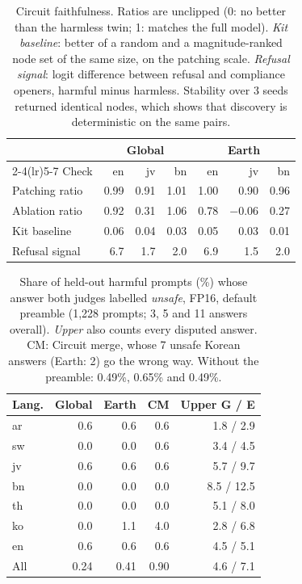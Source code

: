 \documentclass[11pt]{article}
\begin{document}
\begin{table}[ht]
\centering\small
\setlength{\tabcolsep}{2.5pt}
\begin{tabular}{lrrrrrr}
\toprule
& \multicolumn{3}{c}{Global} & \multicolumn{3}{c}{Earth} \\
\cmidrule(lr){2-4}\cmidrule(lr){5-7}
Check & en & jv & bn & en & jv & bn \\
\midrule
Patching ratio & 0.99 & 0.91 & 1.01 & 1.00 & 0.90 & 0.96 \\
Ablation ratio & 0.92 & 0.31 & 1.06 & 0.78 & $-$0.06 & 0.27 \\
Kit baseline & 0.06 & 0.04 & 0.03 & 0.05 & 0.03 & 0.01 \\
Refusal signal & 6.7 & 1.7 & 2.0 & 6.9 & 1.5 & 2.0 \\
\bottomrule
\end{tabular}
\caption{Circuit faithfulness. Ratios are unclipped (0: no better than the harmless twin; 1: matches the full
model). \emph{Kit baseline}: better of a random and a magnitude-ranked node set of the same size, on the patching
scale. \emph{Refusal signal}: logit difference between refusal and compliance openers, harmful minus harmless.
Stability over 3 seeds returned identical nodes, which shows that discovery is deterministic on the same pairs.}
\label{tab:faith}
\end{table}

\begin{table}[ht]
\centering\small
\setlength{\tabcolsep}{3pt}
\begin{tabular}{lrrrr}
\toprule
Lang. & Global & Earth & CM & Upper G / E \\
\midrule
ar & 0.6 & 0.6 & 0.6 & 1.8 / 2.9 \\
sw & 0.0 & 0.0 & 0.6 & 3.4 / 4.5 \\
jv & 0.6 & 0.6 & 0.6 & 5.7 / 9.7 \\
bn & 0.0 & 0.0 & 0.0 & 8.5 / 12.5 \\
th & 0.0 & 0.0 & 0.0 & 5.1 / 8.0 \\
ko & 0.0 & 1.1 & 4.0 & 2.8 / 6.8 \\
en & 0.6 & 0.6 & 0.6 & 4.5 / 5.1 \\
\midrule
All & 0.24 & 0.41 & 0.90 & 4.6 / 7.1 \\
\bottomrule
\end{tabular}
\caption{Share of held-out harmful prompts (\%) whose answer both judges labelled \textit{unsafe}, FP16, default
preamble (1,228 prompts; 3, 5 and 11 answers overall). \emph{Upper} also counts every disputed answer. CM:
Circuit merge, whose 7 unsafe Korean answers (Earth: 2) go the wrong way. Without the preamble: 0.49\%, 0.65\%
and 0.49\%.}
\label{tab:asr}
\end{table}
\end{document}
